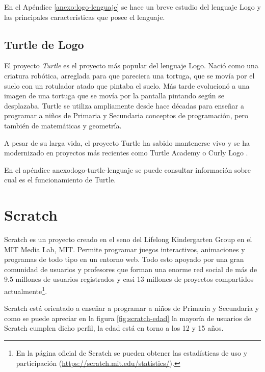 En el Apéndice \ref{anexo:logo-lenguaje} se hace un breve estudio del lenguaje Logo y las principales características que posee el lenguaje.



\subsection{Turtle de Logo}
\label{sec:turtle}

El proyecto \emph{Turtle} es el proyecto más popular del lenguaje Logo. Nació como una criatura robótica, arreglada para que pareciera una tortuga, que se movía por el suelo con un rotulador atado que pintaba el suelo. Más tarde evolucionó a una imagen de una tortuga que se movía por la pantalla pintando según se desplazaba. Turtle se utiliza ampliamente desde hace décadas para enseñar a programar a niños de Primaria y Secundaria conceptos de programación, pero también de matemáticas y geometría\cite{abelson1980disessa,brown1995101}.

A pesar de su larga vida, el proyecto Turtle ha sabido mantenerse vivo y se ha modernizado en proyectos más recientes como Turtle Academy \cite{turtle-academy} o Curly Logo \cite{curly-logo}.

En el apéndice {anexo:logo-turtle-lenguaje} se puede consultar información sobre cual es el funcionamiento de Turtle.


\section{Scratch}
\label{sec:scratch}


Scratch\cite{scratch} es un proyecto creado en el seno del Lifelong Kindergarten Group en el MIT Media Lab, \acrfull{MIT}. Permite programar juegos interactivos, animaciones y programas de todo tipo en un entorno web. Todo esto apoyado por una gran comunidad de usuarios y profesores que forman una enorme red social de más de 9.5 millones de usuarios registrados y casi 13 millones de proyectos compartidos actualmente\footnote{En la página oficial de Scratch se pueden obtener las estadísticas de uso y participación (\url{https://scratch.mit.edu/statistics/}).}.

Scratch está orientado a enseñar a programar a niños de Primaria y Secundaria y como se puede apreciar en la figura \ref{fig:scratch-edad} la mayoría de usuarios de Scratch cumplen dicho perfil, la edad está en torno a los 12 y 15 años.

